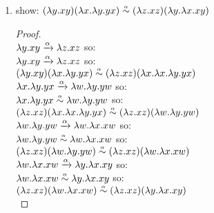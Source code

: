 \begin{enumerate}

	\def \proveL { ( \lambda y. x y ) ( \lambda x. \lambda y. y x) }
	\def \proveR { ( \lambda z. x z ) ( \lambda y. \lambda x. x y ) }

	\def \abstractionAL { \proveL }
	\def \abstractionAR { ( \lambda z. x z ) (\lambda x. \lambda x. \lambda y. y x) }
	\def \abstractionBL { \abstractionAR }
	\def \abstractionBR { ( \lambda z. x z ) ( \lambda w. \lambda y. y w ) }
	\def \abstractionCL { \abstractionBR }
	\def \abstractionCR { ( \lambda z. x z) ( \lambda w. \lambda x. x w ) }
	\def \abstractionDL  { \abstractionCR }
	\def \abstractionDR { \proveR }

	\item show: \( \proveL \alphacongruent \proveR  \)
	
	\begin{proof}
	\\
		\( \lambda y. x y \xrightarrow{\alpha} \lambda z. x z \) \hspace*{4mm} so: \\
		\( \lambda y. x y \xrightarrow{\alpha} \lambda z. x z \) \hspace*{4mm} so: \\
		\( \abstractionAL \alphacongruent \abstractionAR \) \\
		
		\( \lambda x. \lambda y. y x \xrightarrow{\alpha} \lambda w. \lambda y. y w \) \hspace*{4mm} so: \\
		\( \lambda x. \lambda y. y x \alphacongruent \lambda w. \lambda y. y w \) \hspace*{4mm} so: \\
		\( \abstractionBL \alphacongruent \abstractionBR \) \\
		
		\( \lambda w. \lambda y. y w \xrightarrow{\alpha} \lambda w. \lambda x. x w \) \hspace*{4mm} so: \\
		\( \lambda w. \lambda y. y w \alphacongruent \lambda w. \lambda x. x w \) \hspace*{4mm} so: \\
		\( \abstractionCL \alphacongruent \abstractionCR \) \\
		
		\( \lambda w. \lambda x. x w \xrightarrow{\alpha} \lambda y. \lambda x. x y \) \hspace*{4mm} so: \\
		\( \lambda w. \lambda x. x w \alphacongruent \lambda y. \lambda x. x y \) \hspace*{4mm} so: \\
		\( \abstractionDL \alphacongruent \abstractionDR \) \\
		

\end{proof}
\end{enumerate}

